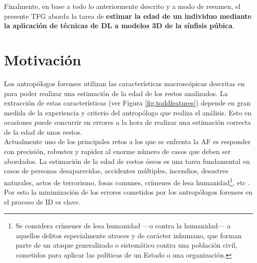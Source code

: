 
Finalmente, en base a todo lo anteriormente descrito y a modo de resumen, el presente TFG aborda la tarea de \textbf{estimar la edad de un individuo mediante la aplicación de técnicas de DL a modelos 3D de la sínfisis púbica}.
\newpage
\section{Motivación}
Los antropólogos forenses utilizan las características macroscópicas descritas en \cite{todd1921age} para poder realizar una estimación de la edad de los restos analizados. La extracción de estas características (ver Figura \ref{fig:toddfeatures}) depende en gran medida de la experiencia y criterio del antropólogo que realiza el análisis. Esto en ocasiones puede concurrir en errores a la hora de realizar una estimación correcta de la edad de unos restos.\\

Actualmente uno de los principales retos a los que se enfrenta la AF es responder con precisión, robustez y rapidez al enorme número de casos que deben ser abordados. La estimación de la edad de restos óseos es una tarea fundamental en casos de personas desaparecidas, accidentes múltiples, incendios, desastres naturales, actos de terrorismo, fosas comunes, crímenes de lesa humanidad\footnote{Se considera crímenes de lesa humanidad —o contra la humanidad— a aquellos delitos especialmente atroces y de carácter inhumano, que forman parte de un ataque generalizado o sistemático contra una población civil, cometidos para aplicar las políticas de un Estado o una organización.}, etc \cite{ubelaker2008forensic, ubelaker2020recent}. Por esto la minimización de los errores cometidos por los antropólogos forenses en el proceso de ID es clave.\\


